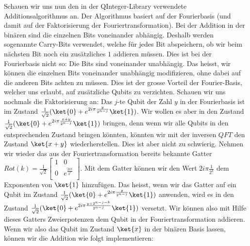 Schauen wir uns nun den in der QInteger-Library verwendete Additionsalgorithmus an. Der Algorithmus basiert auf der Fourierbasis (und damit auf der Faktorisierung der Fouriertransformation). Bei der Addition in der binären sind die einzelnen Bits voneinander abhängig. Deshalb werden sogenannte Carry-Bits verwendet, welche für jedes Bit abspeichern, ob wir beim nächsten Bit noch ein zusätzliches $1$ addieren müssen. Dies ist bei der Fourierbasis nicht so: Die Bits sind voneinander unabhängig. Das heisst, wir können die einzelnen Bits voneinander unabhängig modifizieren, ohne dabei auf die anderen Bits achten zu müssen. Dies ist der grosse Vorteil der Fourier-Basis, welcher uns erlaubt, auf zusätzliche Qubits zu verzichten. Schauen wir uns nochmals die Faktorisierung an: Das $j$-te Qubit der Zahl $y$ in der Fourierbasis ist im Zustand $\frac{1}{\sqrt{2}}(\ket{0} + e^{2i\pi\frac{y}{2^{n - j}}}\ket{1})$. Wir wollen es aber in den Zustand $\frac{1}{\sqrt{2}}(\ket{0} + e^{2i\pi\frac{x + y}{2^{n - j}}}\ket{1})$ bringen, denn wenn wir alle Qubits in den entsprechenden Zustand bringen könnten, könnten wir mit der inversen $QFT$ den Zustand $\ket{x + y}$ wiederherstellen. Dies ist aber nicht zu schwierig. Nehmen wir wieder das aus der Fouriertransformation bereits bekannte Gatter $Rot(k) = \frac{1}{\sqrt{2}}\begin{bmatrix}
    1 & 0 \\
    0 & e^{\frac{2i\pi}{2^k}} \\
\end{bmatrix}$. Mit dem Gatter können wir den Wert $2i\pi\frac{1}{2^k}$ dem Exponenten von $\ket{1}$ hinzufügen. Das heisst, wenn wir das Gatter auf ein Qubit im Zustand $\frac{1}{\sqrt{2}}(\ket{0} + e^{2i\pi\frac{y}{2^{n - j}}}\ket{1})$ anwenden, wird es in den Zustand $\frac{1}{\sqrt{2}}(\ket{0} + e^{2i\pi\frac{y + 2^{n - j - k}}{2^{n - j}}}\ket{1})$ versetzt. Wir können also mit Hilfe dieses Gatters Zweierpotenzen dem Qubit in der Fouriertransformation addieren. Wenn wir also das Qubit im Zustand $\ket{x}$ in der binären Basis lassen, können wir die Addition wie folgt implementieren:
